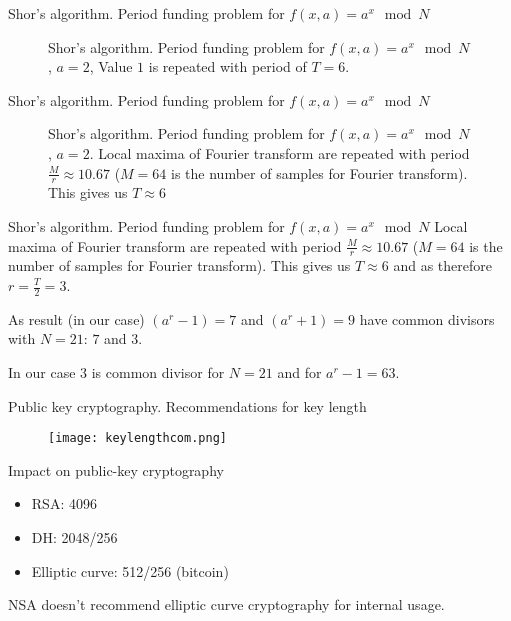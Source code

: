 \documentclass[10pt,pdf,hyperref={unicode}]{beamer}
\begin{document}
\begin{frame}{Shor's algorithm. Period funding problem for
  $f\left(x, a\right) = a^x \mod{N}$}
\begin{figure}
\centering

\scalebox{.65}{}

\caption{Shor's algorithm. Period funding problem for
  $f\left(x, a\right) = a^x \mod{N}$, $a=2$,  
  Value $1$ is repeated with period of $T=6$.}
\end{figure}
\end{frame}

\begin{frame}{Shor's algorithm. Period funding problem for
  $f\left(x, a\right) = a^x \mod{N}$}
\begin{figure}
\centering

\scalebox{.6}{}

\caption{Shor's algorithm. Period funding problem for
  $f\left(x, a\right) = a^x \mod{N}$, $a=2$. 
  Local maxima of Fourier transform are repeated with period
  $\frac{M}{r} \approx 10.67$ ($M = 64$ is the number of samples for
  Fourier transform). This gives us $T\approx 6$}
\end{figure}
\end{frame}

\begin{frame}{Shor's algorithm. Period funding problem for
  $f\left(x, a\right) = a^x \mod{N}$}
  Local maxima of Fourier transform are repeated with period
  $\frac{M}{r} \approx 10.67$ ($M = 64$ is the number of samples for
  Fourier transform). This gives us $T\approx 6$ and as therefore
  $r=\frac{T}{2}=3$.

  As result (in our case)
  $(a^r-1) = 7$ and $(a^r + 1) = 9$ have common divisors with
  $N=21$: $7$ and $3$.

  In our case $3$ is common divisor for $N=21$ and for $a^r-1 = 63$.
\end{frame}


\begin{frame}{Public key cryptography. Recommendations for key length}
 \begin{figure} 
   \texttt{[image: keylengthcom.png]}
  \end{figure}
\end{frame}

\begin{frame}{Impact on public-key cryptography}
\begin{itemize}
\item RSA: 4096
\item DH: 2048/256
\item Elliptic curve: 512/256 (bitcoin) 
\end{itemize}

NSA doesn't recommend elliptic curve cryptography for internal usage.
\end{frame}
\end{document}
